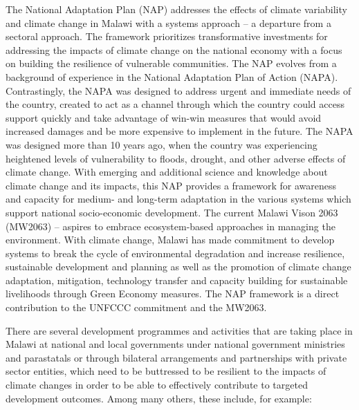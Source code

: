 \documentclass[
]{book}
\begin{document}
The National Adaptation Plan (NAP) addresses the effects of climate variability and climate change in Malawi with a systems approach -- a departure from a
sectoral approach. The framework prioritizes transformative investments for addressing the impacts of climate change on the national economy with a focus on
building the resilience of vulnerable communities. The NAP evolves from a background of experience in the National Adaptation Plan of Action (NAPA).
Contrastingly, the NAPA was designed to address urgent and immediate needs of the country, created to act as a channel through which the country could access
support quickly and take advantage of win-win measures that would avoid increased damages and be more expensive to implement in the future. The NAPA was designed
more than 10 years ago, when the country was experiencing heightened levels of vulnerability to floods, drought, and other adverse effects of climate change.
With emerging and additional science and knowledge about climate change and its impacts, this NAP provides a framework for awareness and capacity for medium- and
long-term adaptation in the various systems which support national socio-economic development. The current Malawi Vison 2063 (MW2063) -- aspires to embrace
ecosystem-based approaches in managing the environment. With climate change, Malawi has made commitment to develop systems to break the cycle of environmental
degradation and increase resilience, sustainable development and planning as well as the promotion of climate change adaptation, mitigation, technology transfer
and capacity building for sustainable livelihoods through Green Economy measures. The NAP framework is a direct contribution to the UNFCCC commitment and the
MW2063.

There are several development programmes and activities that are taking place in Malawi at national and local governments under national government ministries
and parastatals or through bilateral arrangements and partnerships with private sector entities, which need to be buttressed to be resilient to the impacts of
climate changes in order to be able to effectively contribute to targeted development outcomes. Among many others, these include, for example:
\end{document}

